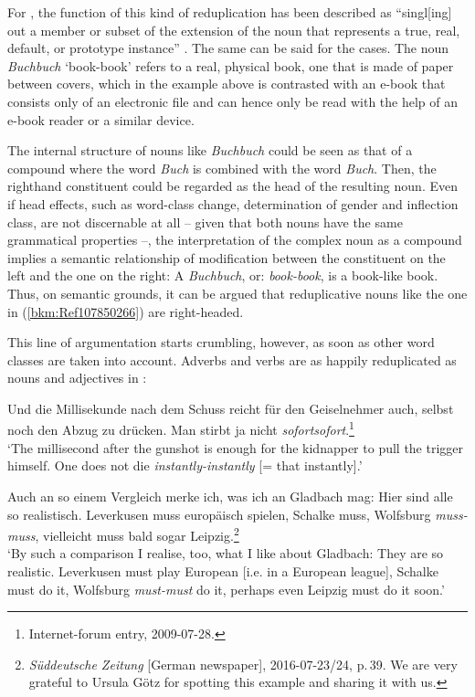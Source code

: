 \documentclass[output=paper
  ,nobabel
  ,draftmode
  ,colorlinks, citecolor=brown
]{langscibook}
\begin{document}
\enlargethispage{2pt}
\noindent
For , the function of this kind of reduplication has been described as ``singl[ing] out a
member or subset of the extension of the noun that represents a true, real, default, or prototype
instance'' \citep[48]{Horn1993}. The same can be said for the  cases. The noun \emph{Buchbuch}
`book-book' refers to a real, physical book, one that is made of paper between covers, which in the
example above is contrasted with an e-book that consists only of an electronic file and can hence
only be read with the help of an e-book reader or a similar device.

The internal structure of nouns like \emph{Buchbuch} could be seen as that of a compound where the
word \emph{Buch} is combined with the word \emph{Buch}. Then, the righthand constituent could be
regarded as the head of the resulting noun. Even if head effects, such as word-class change,
determination of gender and inflection class, are not discernable at all – given that both nouns
have the same grammatical properties –, the interpretation of the complex noun as a compound implies
a semantic relationship of modification between the constituent on the left and the one on the
right: A \emph{Buchbuch}, or: \emph{book-book}, is a book-like book. Thus, on semantic grounds, it
can be argued that reduplicative nouns like the one in (\ref{bkm:Ref107850266}) are right-headed.

This line of argumentation starts crumbling, however, as soon as other word classes are taken into
account. Adverbs and verbs are as happily reduplicated as nouns and adjectives in :

\ea
\label{bkm:Ref107864878}%
Und die Millisekunde nach dem Schuss reicht für den Geiselnehmer auch, selbst noch den Abzug zu drücken. Man stirbt ja nicht \emph{sofortsofort}.\footnote{Internet-forum entry, 2009-07-28.}\\
`The millisecond after the gunshot is enough for the kidnapper to pull the trigger himself. One does not die \emph{instantly-instantly} [= that instantly].'
\z

\ea
\label{bkm:Ref107850306}%
Auch an so einem Vergleich merke ich, was ich an Gladbach mag: Hier sind alle so
realistisch. Leverkusen muss europäisch spielen, Schalke muss, Wolfsburg \emph{muss-muss},
vielleicht muss bald sogar Leipzig.\footnote{\emph{Süddeutsche Zeitung} [German newspaper],
  2016-07-23/24, p.\,39. We are very grateful to Ursula Götz for spotting this example and sharing
  it with us.}\\
`By such a comparison I realise, too, what I like about Gladbach: They are so realistic. Leverkusen must play European [i.e. in a European league], Schalke must do it, Wolfsburg \emph{must-must} do it, perhaps even Leipzig must do it soon.'
\z
\end{document}

